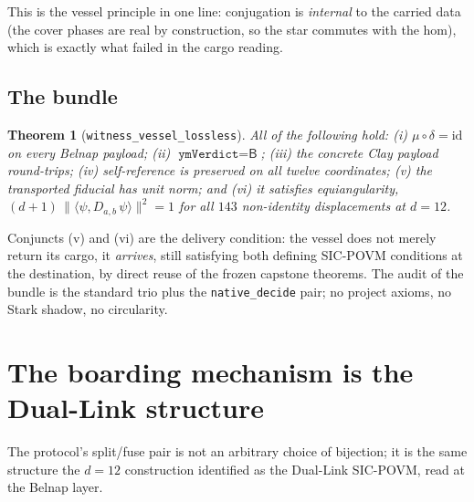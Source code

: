 \documentclass[12pt,a4paper]{article}
\newtheorem{theorem}{Theorem}[section]
\newcommand{\bB}{\textsf{B}}
\begin{document}
This is the vessel principle in one line: conjugation is \emph{internal}
to the carried data (the cover phases are real by construction, so the
star commutes with the hom), which is exactly what failed in the cargo
reading.

\subsection{The bundle}

\begin{theorem}[\texttt{witness\_vessel\_lossless}]
\label{thm:bundle}
All of the following hold:
(i) $\mu \circ \delta = \mathrm{id}$ on every Belnap payload;
(ii) $\texttt{ymVerdict} = \bB$;
(iii) the concrete Clay payload round-trips;
(iv) self-reference is preserved on all twelve coordinates;
(v) the transported fiducial has unit norm; and
(vi) it satisfies equiangularity,
$(d+1)\,\lVert\langle\psi, D_{a,b}\,\psi\rangle\rVert^2 = 1$
for all $143$ non-identity displacements at $d = 12$.
\end{theorem}

Conjuncts (v) and (vi) are the delivery condition: the vessel does not
merely return its cargo, it \emph{arrives}, still satisfying both defining
SIC-POVM conditions at the destination, by direct reuse of the frozen
capstone theorems. The audit of the bundle is the standard trio plus the
\texttt{native\_decide} pair; no project axioms, no Stark shadow, no
circularity.

\section{The boarding mechanism is the Dual-Link structure}
\label{sec:duallink}

The protocol's split/fuse pair is not an arbitrary choice of bijection; it
is the same structure the $d=12$ construction identified as the Dual-Link
SIC-POVM, read at the Belnap layer.
\end{document}
